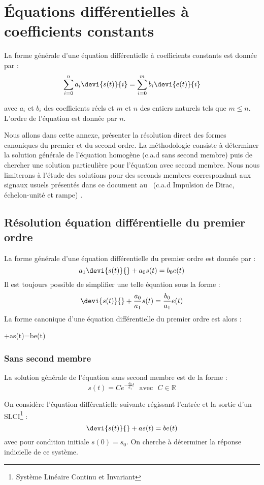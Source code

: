 \chapter{Équations différentielles à coefficients constants\label{annexe-eqndiff}}

La forme générale d'une équation différentielle à coefficients constants est donnée
par :
\begin{align}
\sum_{i=0}^{n}a_i\devi{s(t)}{i}=\sum_{i=0}^{m}b_i\devi{e(t)}{i}
\end{align}

avec $a_i$ et $b_i$ des coefficients réels et $m$ et $n$ des entiers naturels tels que $m\le n$.
L'ordre de l'équation est donnée par $n$.

Nous allons dans cette annexe, présenter la résolution direct 
des formes canoniques du premier et du second ordre. La méthodologie consiste
à déterminer la solution générale de l'équation homogène (c.a.d sans second membre)
puis de chercher une solution particulière pour l'équation avec second membre.
Nous nous limiterons à l'étude des solutions pour des seconds membres correspondant
aux signaux usuels présentés dans ce document au~ (c.a.d Impulsion de Dirac, échelon-unité et rampe) .

\section{Résolution équation différentielle du premier ordre}

La forme générale d'une équation différentielle du premier ordre est
donnée par : 
$$
a_1\devi{s(t)}{}+a_0s(t)=b_0e(t)
$$
Il est toujours possible de simplifier une telle équation sous la forme :
$$
\devi{s(t)}{}+\dfrac{a_0}{a_1}s(t)=\dfrac{b_0}{a_1}e(t)
$$
La forme canonique d'une équation différentielle du premier ordre est alors :
\begin{bequation}
+as(t)=be(t)
\end{bequation}


\subsection{Sans second membre}

La solution générale de l'équation sans second membre est de la forme :
$$
s(t) = C e^{-\frac{a_0}{a_1}t}\,\,\,\,\text{avec}\,\,\,\,C\in\mathbb{R}
$$

On considère l'équation différentielle suivante régissant l'entrée
et la sortie d'un SLCI\footnote{Système Linéaire Continu et Invariant} :
$$
\devi{s(t)}{}+as(t)=be(t)
$$
avec pour condition initiale $s(0)=s_0$.
On cherche à déterminer la réponse indicielle de ce système.
                                                                                                                                          
